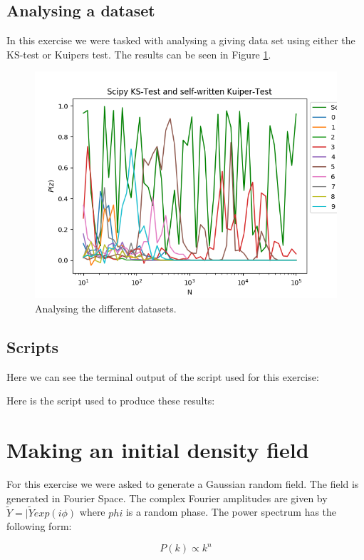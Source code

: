 \documentclass[a4paper,10pt]{article}
\begin{document}
\subsection{Analysing a dataset}

In this exercise we were tasked with analysing a giving data set using either the KS-test or Kuipers test. The results can be seen in Figure \ref{fig:1g}.

\begin{figure}[h!]
  \centering
  \includegraphics[width=0.8\linewidth]{./plots/1g.png}
  \caption{Analysing the different datasets.}
  \label{fig:1g}
\end{figure}

\subsection{Scripts}

Here we can see the terminal output of the script used for this exercise:


Here is the script used to produce these results: 


\section{Making an initial density field}

For this exercise we were asked to generate a Gaussian random field. The field is generated in Fourier Space. The complex Fourier amplitudes are given by $\tilde{Y}=|\tilde{Y}exp(i\phi)$ where $phi$ is a random phase. The power spectrum has the following form: 

\begin{equation}
P(k) \propto k^n
\end{equation}
\end{document}
